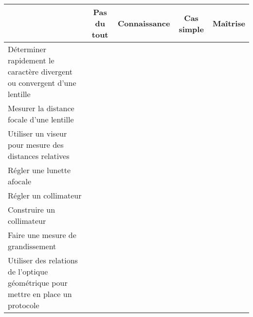\documentclass[11pt,french,landscape]{article}
\begin{document}

\begin{tabular}{|l|c|c|c|c|}
\toprule
 & Pas du tout & Connaissance & Cas simple & Maîtrise\\
\toprule
Déterminer rapidement le caractère divergent ou convergent d'une lentille & & & & \\
\midrule
Mesurer la distance focale d'une lentille & & & & \\
\midrule
Utiliser un viseur pour mesure des distances relatives & & & & \\
\midrule
Régler une lunette afocale & & & & \\
\midrule
Régler un collimateur & & & & \\
\midrule
Construire un collimateur & & & & \\
\midrule
Faire une mesure de grandissement & & & & \\
\midrule
Utiliser des relations de l'optique géométrique pour mettre en place un protocole & & & & \\
\bottomrule
\end{tabular}
\end{document}
